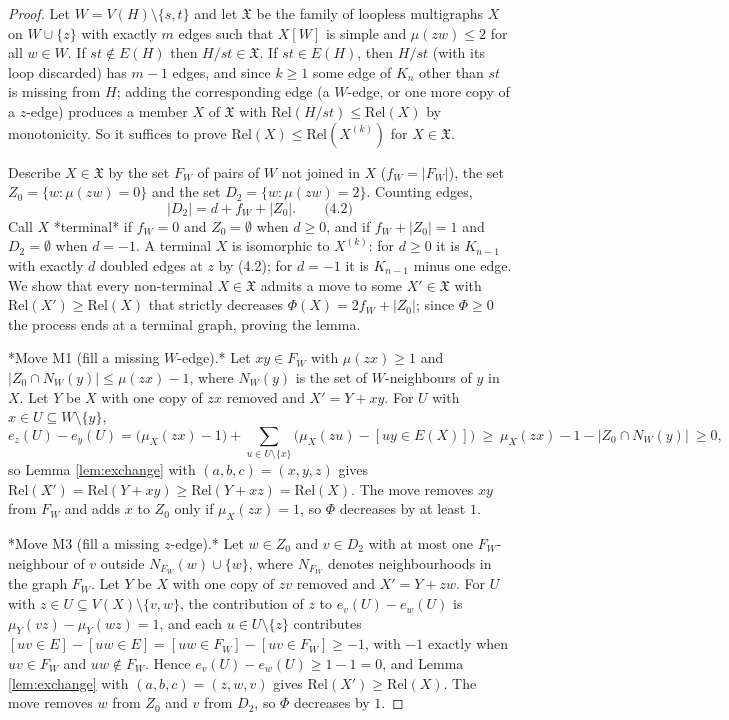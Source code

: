 \documentclass[
  11pt,
]{article}
\theoremstyle{definition}
\theoremstyle{remark}
\begin{document}
\begin{proof}
Let $W=V(H)\setminus\{s,t\}$ and let $\mathfrak X$ be the family of loopless multigraphs $X$ on $W\cup\{z\}$ with exactly $m$ edges such that $X[W]$ is simple and $\mu(zw)\le2$ for all $w\in W$. If $st\notin E(H)$ then $H/st\in\mathfrak X$. If $st\in E(H)$, then $H/st$ (with its loop discarded) has $m-1$ edges, and since $k\ge1$ some edge of $K_n$ other than $st$ is missing from $H$; adding the corresponding edge (a $W$-edge, or one more copy of a $z$-edge) produces a member $X$ of $\mathfrak X$ with $\mathrm{Rel}(H/st)\le\mathrm{Rel}(X)$ by monotonicity. So it suffices to prove $\mathrm{Rel}(X)\le\mathrm{Rel}(X^{(k)})$ for $X\in\mathfrak X$.

Describe $X\in\mathfrak X$ by the set $F_W$ of pairs of $W$ not joined in $X$ ($f_W=|F_W|$), the set $Z_0=\{w:\mu(zw)=0\}$ and the set $D_2=\{w:\mu(zw)=2\}$. Counting edges,
$$|D_2|=d+f_W+|Z_0|.\qquad\text{(4.2)}$$
Call $X$ *terminal* if $f_W=0$ and $Z_0=\emptyset$ when $d\ge0$, and if $f_W+|Z_0|=1$ and $D_2=\emptyset$ when $d=-1$. A terminal $X$ is isomorphic to $X^{(k)}$: for $d\ge0$ it is $K_{n-1}$ with exactly $d$ doubled edges at $z$ by (4.2); for $d=-1$ it is $K_{n-1}$ minus one edge. We show that every non-terminal $X\in\mathfrak X$ admits a move to some $X'\in\mathfrak X$ with $\mathrm{Rel}(X')\ge\mathrm{Rel}(X)$ that strictly decreases $\Phi(X)=2f_W+|Z_0|$; since $\Phi\ge0$ the process ends at a terminal graph, proving the lemma.

*Move M1 (fill a missing $W$-edge).* Let $xy\in F_W$ with $\mu(zx)\ge1$ and $|Z_0\cap N_W(y)|\le\mu(zx)-1$, where $N_W(y)$ is the set of $W$-neighbours of $y$ in $X$. Let $Y$ be $X$ with one copy of $zx$ removed and $X'=Y+xy$. For $U$ with $x\in U\subseteq W\setminus\{y\}$,
$$e_z(U)-e_y(U)=\big(\mu_X(zx)-1\big)+\sum_{u\in U\setminus\{x\}}\big(\mu_X(zu)-[uy\in E(X)]\big)\ \ge\ \mu_X(zx)-1-|Z_0\cap N_W(y)|\ \ge 0,$$
so Lemma \ref{lem:exchange} with $(a,b,c)=(x,y,z)$ gives $\mathrm{Rel}(X')=\mathrm{Rel}(Y+xy)\ge\mathrm{Rel}(Y+xz)=\mathrm{Rel}(X)$. The move removes $xy$ from $F_W$ and adds $x$ to $Z_0$ only if $\mu_X(zx)=1$, so $\Phi$ decreases by at least $1$.

*Move M3 (fill a missing $z$-edge).* Let $w\in Z_0$ and $v\in D_2$ with at most one $F_W$-neighbour of $v$ outside $N_{F_W}(w)\cup\{w\}$, where $N_{F_W}$ denotes neighbourhoods in the graph $F_W$. Let $Y$ be $X$ with one copy of $zv$ removed and $X'=Y+zw$. For $U$ with $z\in U\subseteq V(X)\setminus\{v,w\}$, the contribution of $z$ to $e_v(U)-e_w(U)$ is $\mu_Y(vz)-\mu_Y(wz)=1$, and each $u\in U\setminus\{z\}$ contributes $[uv\in E]-[uw\in E]=[uw\in F_W]-[uv\in F_W]\ge-1$, with $-1$ exactly when $uv\in F_W$ and $uw\notin F_W$. Hence $e_v(U)-e_w(U)\ge1-1=0$, and Lemma \ref{lem:exchange} with $(a,b,c)=(z,w,v)$ gives $\mathrm{Rel}(X')\ge\mathrm{Rel}(X)$. The move removes $w$ from $Z_0$ and $v$ from $D_2$, so $\Phi$ decreases by $1$.


\end{proof}
\end{document}
